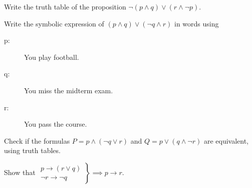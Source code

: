 \documentclass[addpoints,answers]{exam}
\begin{document}
    \pagestyle{headandfoot}
    \runningheadrule

    \firstpagefooter{}{}{}
    \runningfooter{}{}{}
    \begin{flushright}

        \vspace{0.2in}

    \end{flushright}

    \begin{questions}
        \question[10]
            Write the truth table of the proposition $\lnot (p \land q) \lor (r \land \lnot
            p)$.
            \begin{solutionorbox}[\stretch{1}]
            \end{solutionorbox}
            \newpage
        \question[10]
            Write the symbolic expression of $(p \land q) \lor (\lnot q \land r)$ in words
            using
            \begin{description}
                \item[p:] You play football.
                \item[q:] You miss the midterm exam.
                \item[r:] You pass the course.
            \end{description}
            \begin{solutionorbox}[\stretch{1}]
            \end{solutionorbox}
            \newpage
        \question[10]
            Check if the formulas $P = p \land (\lnot q \lor r)$ and $Q = p \lor (q \land
            \lnot r)$ are equivalent, using truth tables.
            \begin{solutionorbox}[\stretch{1}]
            \end{solutionorbox}
            \newpage
        \question[20]
            Show that 
            $
                \left.
                \begin{array}{c}
                    p \to (r \lor q) \\ 
                    \lnot r \to \lnot q
                \end{array}
                \right\}
                \implies 
                p \to r
            $.
            \begin{solutionorbox}[\stretch{1}]
            \end{solutionorbox}
            \newpage
\end{questions}
\end{document}
